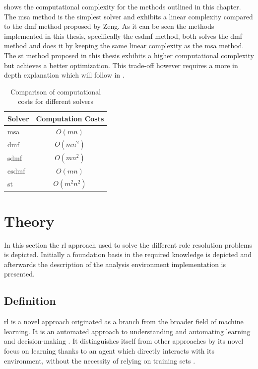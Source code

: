 \documentclass{seal_thesis}
\begin{document}
 shows the computational complexity for the methods outlined in this chapter. The \gls{msa} method is the simplest solver and exhibits a linear complexity compared to the \gls{dmf} method proposed by Zeng. As it can be seen the methods implemented in this thesis, specifically the \gls{esdmf} method, both solves the \gls{dmf} method and does it by keeping the same linear complexity as the \gls{msa} method. The \gls{st} method proposed in this thesis exhibits a higher computational complexity but achieves a better optimization. This trade-off however requires a more in depth explanation which will follow in .

\begin{table}[!ht]
\centering
\begin{tabular}{@{}lc@{}}
\toprule
Solver & Computation Costs \\ \midrule
\gls{msa}    & $O(mn)$           \\
\gls{dmf}   & $O(mn^2)$         \\
\gls{sdmf}  & $O(mn^2)$         \\
\gls{esdmf}  & $O(mn)$           \\
\gls{st} 	   & $O(m^2n^2)$ \\	\bottomrule
\end{tabular}
\caption{Comparison of computational costs for different solvers}
\label{tab:big_oh_solvers}
\end{table}

\section{ Theory}

In this section the \gls{rl} approach used to solve the different role resolution problems is depicted. Initially a foundation basis in the required knowledge is depicted and afterwards the description of the analysis environment implementation is presented.

\subsection{ Definition}

\gls{rl} is a novel approach originated as a branch from the broader field of machine learning. It is an automated approach to understanding and automating learning and decision-making \cite[p. 15]{Sutton2017}. It distinguishes itself from other approaches by its novel focus on learning thanks to an agent which directly interacts with its environment, without the necessity of relying on training sets \cite[p. 15]{Sutton2017}.
\end{document}
